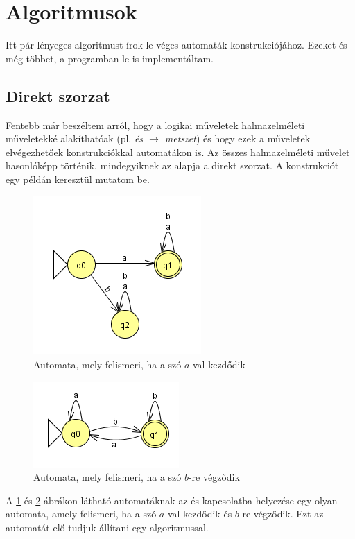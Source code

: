 \documentclass[12pt]{report}
\theoremstyle{definition}
\begin{document}
\section{Algoritmusok}
Itt pár lényeges algoritmust írok le véges automaták konstrukciójához. Ezeket és még többet, a programban le is implementáltam.

\subsection{Direkt szorzat}
Fentebb már beszéltem arról, hogy a logikai műveletek halmazelméleti műveletekké alakíthatóak (pl. \textit{és $\rightarrow$ metszet}) és hogy ezek a műveletek elvégezhetőek konstrukciókkal automatákon is. Az összes halmazelméleti művelet hasonlóképp történik, mindegyiknek az alapja a direkt szorzat. A konstrukciót egy példán keresztül mutatom be.
\begin{figure}[H]
\centering
\includegraphics[scale=1]{direkt_a_val_kezd.png}
\caption{\label{direkt-egy} Automata, mely felismeri, ha a szó $a$-val kezdődik}
\end{figure}

\begin{figure}[H]
\centering
\includegraphics[scale=1]{direkt_b_re_vegzodik.png}
\caption{\label{direkt-ketto} Automata, mely felismeri, ha a szó $b$-re végződik}
\end{figure}

A \ref{direkt-egy} és \ref{direkt-ketto} ábrákon látható automatáknak az és kapcsolatba helyezése egy olyan automata, amely felismeri, ha a szó $a$-val kezdődik és $b$-re végződik. Ezt az automatát elő tudjuk állítani egy algoritmussal.
\end{document}
